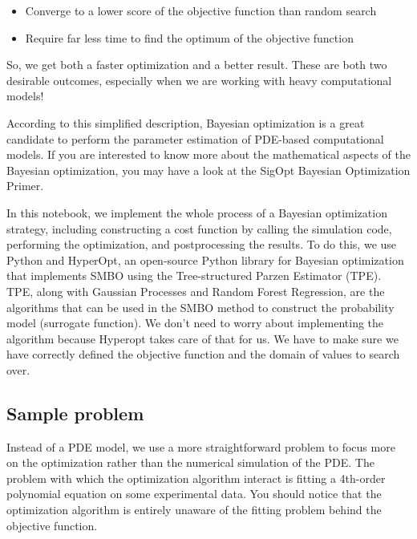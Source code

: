 \begin{subappendices}
\begin{itshape}
\begin{itemize}
\item
Converge to a lower score of the objective function than random search
\item
Require far less time to find the optimum of the objective function
\end{itemize}

So, we get both a faster optimization and a better result. These are both two desirable outcomes, especially when we are working with heavy computational models!
\end{itshape}

According to this simplified description, Bayesian optimization is a great candidate to perform the parameter estimation of {PDE}-based computational models. If you are interested to know more about the mathematical aspects of the Bayesian optimization, you may have a look at the SigOpt Bayesian Optimization Primer.

In this notebook, we implement the whole process of a Bayesian optimization strategy, including constructing a cost function by calling the simulation code, performing the optimization, and postprocessing the results. To do this, we use Python and HyperOpt, an open-source Python library for Bayesian optimization that implements {SMBO} using the Tree-structured Parzen Estimator ({TPE}). {TPE}, along with Gaussian Processes and Random Forest Regression, are the algorithms that can be used in the {SMBO} method to construct the probability model (surrogate function). We don't need to worry about implementing the algorithm because Hyperopt takes care of that for us. We have to make sure we have correctly defined the objective function and the domain of values to search over.

\subsection{Sample problem}

Instead of a {PDE} model, we use a more straightforward problem to focus more on the optimization rather than the numerical simulation of the {PDE}. The problem with which the optimization algorithm interact is fitting a 4th-order polynomial equation on some experimental data. You should notice that the optimization algorithm is entirely unaware of the fitting problem behind the objective function.


\end{subappendices}
